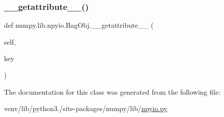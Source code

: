 \subsubsection{\texorpdfstring{\+\_\+\+\_\+getattribute\+\_\+\+\_\+()}{\_\_getattribute\_\_()}}
{\footnotesize\ttfamily def numpy.\+lib.\+npyio.\+Bag\+Obj.\+\_\+\+\_\+getattribute\+\_\+\+\_\+ (\begin{DoxyParamCaption}\item[{}]{self,  }\item[{}]{key }\end{DoxyParamCaption})}



The documentation for this class was generated from the following file\+:\begin{DoxyCompactItemize}
\item 
venv/lib/python3./site-\/packages/numpy/lib/\hyperlink{npyio_8py}{npyio.\+py}\end{DoxyCompactItemize}
